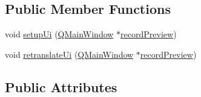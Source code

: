 \subsection*{Public Member Functions}
\begin{DoxyCompactItemize}
\item 
void \hyperlink{a00081_afa41dc070a896a5eae476f3c0206825c}{setup\+Ui} (\hyperlink{a00058}{Q\+Main\+Window} $\ast$\hyperlink{a00073}{record\+Preview})
\item 
void \hyperlink{a00081_ad30b831cfb4b32956fe67a79748ba194}{retranslate\+Ui} (\hyperlink{a00058}{Q\+Main\+Window} $\ast$\hyperlink{a00073}{record\+Preview})
\end{DoxyCompactItemize}
\subsection*{Public Attributes}
